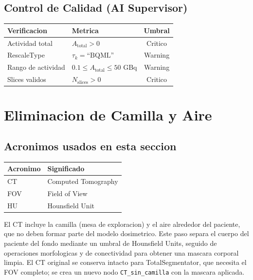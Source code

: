 \documentclass[12pt,a4paper]{article}
\begin{document}
\subsection{Control de Calidad (AI Supervisor)}

\begin{table}[H]
\centering
\begin{tabular}{llc}
\toprule
\textbf{Verificacion} & \textbf{Metrica} & \textbf{Umbral} \\
\midrule
Actividad total & $A_{\text{total}} > 0$ & Critico \\
RescaleType & $\tau_k = \text{``BQML''}$ & Warning \\
Rango de actividad & $0.1 \leq A_{\text{total}} \leq 50$ GBq & Warning \\
Slices validos & $N_{\text{slices}} > 0$ & Critico \\
\bottomrule
\end{tabular}
\end{table}

\newpage

\section{Eliminacion de Camilla y Aire}
\label{sec:camilla}

\subsection*{Acronimos usados en esta seccion}
\begin{tabular}{ll}
\toprule
\textbf{Acronimo} & \textbf{Significado} \\
\midrule
CT & Computed Tomography \\
FOV & Field of View \\
HU & Hounsfield Unit \\
\bottomrule
\end{tabular}

El CT incluye la camilla (mesa de exploracion) y el aire alrededor del paciente, que no deben
formar parte del modelo dosimetrico. Este paso separa el cuerpo del paciente del fondo mediante
un umbral de Hounsfield Units, seguido de operaciones morfologicas y de conectividad para obtener
una mascara corporal limpia. El CT original se conserva intacto para TotalSegmentator, que
necesita el FOV completo; se crea un nuevo nodo \texttt{CT\_sin\_camilla} con la mascara aplicada.
\end{document}
